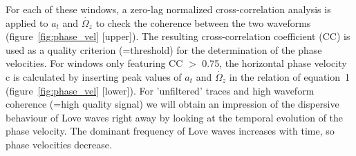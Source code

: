 \documentclass[12pt,reqno,letter]{article} %
\begin{document}
For each of these windows, a zero-lag normalized cross-correlation analysis is applied to $a_t$ and $\dot{\Omega_z}$ to check the coherence between the two waveforms (figure~\ref{fig:phase_vel} [upper]). The resulting cross-correlation coefficient (CC) is used as a quality criterion (=threshold) for the determination of the phase velocities. For windows only featuring CC $>$ 0.75, the horizontal phase velocity c is calculated by inserting peak values of $a_t$ and $\dot{\Omega_z}$ in the relation of equation~1 (figure~\ref{fig:phase_vel} [lower]).
For 'unfiltered' traces and high waveform coherence (=high quality signal) we will obtain an impression of the dispersive behaviour of Love waves right away by looking at the temporal evolution of the phase velocity. The dominant frequency of Love waves increases with time, so phase velocities decrease.
\end{document}
